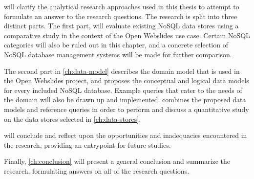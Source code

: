  will clarify the analytical research approaches used in this thesis to attempt to formulate an answer to the research questions.
The research is split into three distinct parts.
The first part,  will evaluate existing NoSQL data stores using a comparative study in the context of the Open Webslides use case.
Certain NoSQL categories will also be ruled out in this chapter, and a concrete selection of NoSQL database management systems will be made for further comparison.

The second part in \cref{ch:data-model} describes the domain model that is used in the Open Webslides project, and proposes the conceptual and logical data models for every included NoSQL database.
Example queries that cater to the needs of the domain will also be drawn up and implemented.
 combines the proposed data models and reference queries in order to perform and discuss a quantitative study on the data stores selected in \cref{ch:data-stores}.

 will conclude and reflect upon the opportunities and inadequacies encountered in the research, providing an entrypoint for future studies.

Finally, \cref{ch:conclusion} will present a general conclusion and summarize the research, formulating answers on all of the research questions.
